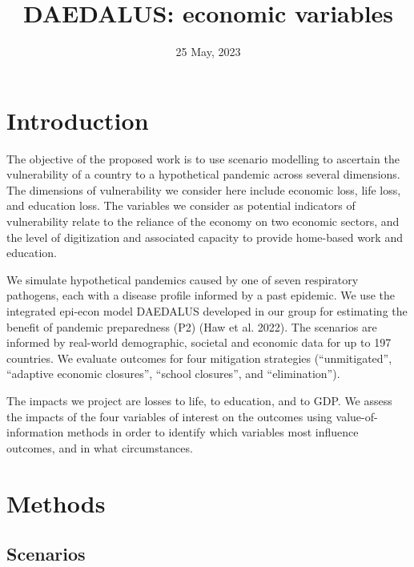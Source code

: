 \documentclass[
]{article}
\title{DAEDALUS: economic variables}
\author{}
\date{\vspace{-2.5em}25 May, 2023}
\begin{document}
\maketitle

{
\setcounter{tocdepth}{5}
\tableofcontents
}

\hypertarget{introduction}{%
\section{Introduction}\label{introduction}}

The objective of the proposed work is to use scenario modelling to ascertain the vulnerability of a country to a hypothetical pandemic across several dimensions. The dimensions of vulnerability we consider here include economic loss, life loss, and education loss. The variables we consider as potential indicators of vulnerability relate to the reliance of the economy on two economic sectors, and the level of digitization and associated capacity to provide home-based work and education.

We simulate hypothetical pandemics caused by one of seven respiratory pathogens, each with a disease profile informed by a past epidemic. We use the integrated epi-econ model DAEDALUS developed in our group for estimating the benefit of pandemic preparedness (P2) (Haw et al. 2022). The scenarios are informed by real-world demographic, societal and economic data for up to 197 countries. We evaluate outcomes for four mitigation strategies (``unmitigated'', ``adaptive economic closures'', ``school closures'', and ``elimination'').

The impacts we project are losses to life, to education, and to GDP. We assess the impacts of the four variables of interest on the outcomes using value-of-information methods in order to identify which variables most influence outcomes, and in what circumstances.

\hypertarget{methods}{%
\section{Methods}\label{methods}}

\hypertarget{scenarios}{%
\subsection{Scenarios}\label{scenarios}}
\end{document}
